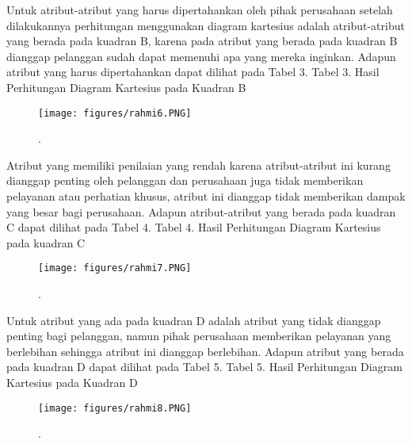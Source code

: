 Untuk atribut-atribut yang harus dipertahankan oleh pihak perusahaan setelah dilakukannya perhitungan menggunakan diagram kartesius adalah atribut-atribut
yang berada pada kuadran B, karena pada atribut yang berada pada kuadran B dianggap pelanggan sudah dapat memenuhi apa yang mereka inginkan. 
Adapun atribut yang harus dipertahankan dapat dilihat pada
Tabel 3.
Tabel 3. Hasil Perhitungan Diagram Kartesius
pada Kuadran B
\begin{figure}[ht]
	\centerline{\texttt{[image: figures/rahmi6.PNG]}}
	\caption{.}
	\label{rahmi6}
	\end{figure}

Atribut yang memiliki penilaian yang rendah karena atribut-atribut ini kurang dianggap penting oleh pelanggan dan perusahaan juga tidak memberikan pelayanan atau perhatian khusus, 
atribut ini dianggap tidak memberikan dampak yang besar bagi perusahaan.
Adapun atribut-atribut yang berada pada kuadran C dapat dilihat pada Tabel 4.
Tabel 4. Hasil Perhitungan Diagram Kartesius pada kuadran C
\begin{figure}[ht]
	\centerline{\texttt{[image: figures/rahmi7.PNG]}}
	\caption{.}
	\label{rahmi7}
	\end{figure}

Untuk atribut yang ada pada kuadran D adalah atribut yang tidak dianggap penting bagi pelanggan, namun pihak perusahaan memberikan pelayanan yang berlebihan 
sehingga atribut ini dianggap berlebihan.
Adapun atribut yang berada pada kuadran D dapat dilihat pada Tabel 5.
Tabel 5. Hasil Perhitungan Diagram Kartesius
pada Kuadran D	
\begin{figure}[ht]
	\centerline{\texttt{[image: figures/rahmi8.PNG]}}
	\caption{.}
	\label{rahmi8}
	\end{figure}


